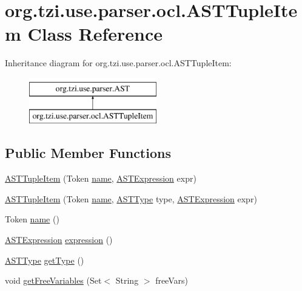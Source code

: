 \hypertarget{classorg_1_1tzi_1_1use_1_1parser_1_1ocl_1_1_a_s_t_tuple_item}{\section{org.\-tzi.\-use.\-parser.\-ocl.\-A\-S\-T\-Tuple\-Item Class Reference}
\label{classorg_1_1tzi_1_1use_1_1parser_1_1ocl_1_1_a_s_t_tuple_item}
}
Inheritance diagram for org.\-tzi.\-use.\-parser.\-ocl.\-A\-S\-T\-Tuple\-Item\-:\begin{figure}[H]
\begin{center}
\leavevmode
\includegraphics[height=2.000000cm]{classorg_1_1tzi_1_1use_1_1parser_1_1ocl_1_1_a_s_t_tuple_item}
\end{center}
\end{figure}
\subsection*{Public Member Functions}
\begin{DoxyCompactItemize}
\item 
\hyperlink{classorg_1_1tzi_1_1use_1_1parser_1_1ocl_1_1_a_s_t_tuple_item_a0e6c320359f7f6fc939e5e1e1a9c9e6d}{A\-S\-T\-Tuple\-Item} (Token \hyperlink{classorg_1_1tzi_1_1use_1_1parser_1_1ocl_1_1_a_s_t_tuple_item_a236c4bc5732eba59b1c6787daa306038}{name}, \hyperlink{classorg_1_1tzi_1_1use_1_1parser_1_1ocl_1_1_a_s_t_expression}{A\-S\-T\-Expression} expr)
\item 
\hyperlink{classorg_1_1tzi_1_1use_1_1parser_1_1ocl_1_1_a_s_t_tuple_item_a6c9c1d467966548ce63d2ebb44458287}{A\-S\-T\-Tuple\-Item} (Token \hyperlink{classorg_1_1tzi_1_1use_1_1parser_1_1ocl_1_1_a_s_t_tuple_item_a236c4bc5732eba59b1c6787daa306038}{name}, \hyperlink{classorg_1_1tzi_1_1use_1_1parser_1_1ocl_1_1_a_s_t_type}{A\-S\-T\-Type} type, \hyperlink{classorg_1_1tzi_1_1use_1_1parser_1_1ocl_1_1_a_s_t_expression}{A\-S\-T\-Expression} expr)
\item 
Token \hyperlink{classorg_1_1tzi_1_1use_1_1parser_1_1ocl_1_1_a_s_t_tuple_item_a236c4bc5732eba59b1c6787daa306038}{name} ()
\item 
\hyperlink{classorg_1_1tzi_1_1use_1_1parser_1_1ocl_1_1_a_s_t_expression}{A\-S\-T\-Expression} \hyperlink{classorg_1_1tzi_1_1use_1_1parser_1_1ocl_1_1_a_s_t_tuple_item_af3644e8d40ba182f81703410c3303d53}{expression} ()
\item 
\hyperlink{classorg_1_1tzi_1_1use_1_1parser_1_1ocl_1_1_a_s_t_type}{A\-S\-T\-Type} \hyperlink{classorg_1_1tzi_1_1use_1_1parser_1_1ocl_1_1_a_s_t_tuple_item_ac56b4f42e59b740f72726bbb88b98af0}{get\-Type} ()
\item 
void \hyperlink{classorg_1_1tzi_1_1use_1_1parser_1_1ocl_1_1_a_s_t_tuple_item_abdaabbe79d51a657fb6cc1a20d1d3d86}{get\-Free\-Variables} (Set$<$ String $>$ free\-Vars)
\end{DoxyCompactItemize}


